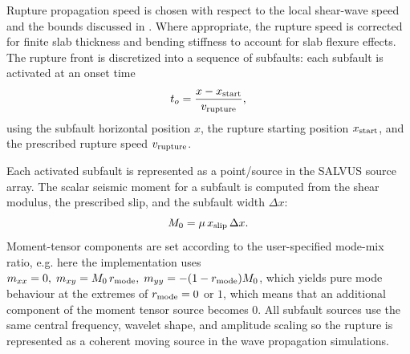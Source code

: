 \documentclass[10pt]{article}
\begin{document}
Rupture propagation speed is chosen with respect to the local shear-wave speed and the bounds discussed in \cite{trottetTransitionSubRayleighAnticrack2022}. Where appropriate, the rupture speed is corrected for finite slab thickness and bending stiffness to account for slab flexure effects. The rupture front is discretized into a sequence of subfaults: each subfault is activated at an onset time
\[ t_o = \frac{x-x_{\rm start}}{v_{\rm rupture}}, \]
using the subfault horizontal position \(x\), the rupture starting position \(x_{\rm start}\), and the prescribed rupture speed \(v_{\rm rupture}\). \par

Each activated subfault is represented as a point/source in the SALVUS source array. The scalar seismic moment for a subfault is computed from the shear modulus, the prescribed slip, and the subfault width \(\Delta x\):
\[ M_0 = \mu\,x_{\rm slip}\,\Delta x. \]
Moment-tensor components are set according to the user-specified mode-mix ratio, e.g. here the implementation uses
\( m_{xx}=0,\; m_{xy}=M_0\,r_{\rm mode},\; m_{yy}=-(1-r_{\rm mode})M_0\),
which yields pure mode behaviour at the extremes of \(r_{\rm mode}=0\) or \(1\), which means that an additional component of the moment tensor source becomes 0. All subfault sources use the same central frequency, wavelet shape, and amplitude scaling so the rupture is represented as a coherent moving source in the wave propagation simulations. \par


\end{document}
